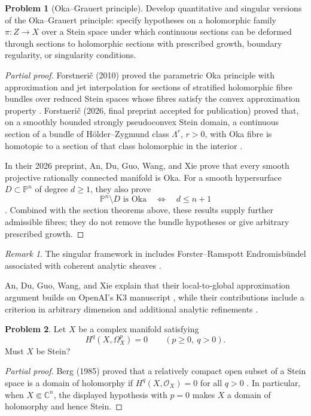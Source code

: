 \documentclass[11pt,reqno]{amsart}
\theoremstyle{definition}
\newtheorem{problem}{Problem}[section]
\theoremstyle{remark}
\newtheorem*{remark}{Remark}
\begin{document}
\begin{problem}[Oka--Grauert principle]\label{Siu-1.3}
Develop quantitative and singular versions of the Oka--Grauert principle: specify hypotheses on a holomorphic family $\pi:Z\to X$ over a Stein space under which continuous sections can be deformed through sections to holomorphic sections with prescribed growth, boundary regularity, or singularity conditions.
\end{problem}
\begin{proof}[Partial proof]
Forstneri\v c (2010) proved the parametric Oka principle with approximation and jet interpolation for sections of stratified holomorphic fibre bundles over reduced Stein spaces whose fibres satisfy the convex approximation property \cite{SIU-For10}. Forstneri\v c (2026, final preprint accepted for publication) proved that, on a smoothly bounded strongly pseudoconvex Stein domain, a continuous section of a bundle of H\"older--Zygmund class $\Lambda^r$, $r>0$, with Oka fibre is homotopic to a section of that class holomorphic in the interior \cite{SIU-For26}.

In their 2026 preprint, An, Du, Guo, Wang, and Xie prove that every smooth projective rationally connected manifold is Oka. For a smooth hypersurface $D\subset\mathbb P^n$ of degree $d\geq1$, they also prove
\[
\mathbb P^n\setminus D\text{ is Oka}\quad\Longleftrightarrow\quad d\leq n+1
\]
\cite[Theorems~1.10--1.11]{SIU-ADGWX26}. Combined with the section theorems above, these results supply further admissible fibres; they do not remove the bundle hypotheses or give arbitrary prescribed growth.
\end{proof}
\begin{remark}
The singular framework in \cite[\S1.3]{Siu2025} includes Forster--Ramspott Endromisb\"undel associated with coherent analytic sheaves \cite{SIU-FR66}.

An, Du, Guo, Wang, and Xie explain that their local-to-global approximation argument builds on OpenAI's K3 manuscript \cite{SIU-OAIK326}, while their contributions include a criterion in arbitrary dimension and additional analytic refinements \cite[\S1, ``Relation to the work of OpenAI'']{SIU-ADGWX26}.
\end{remark}

\begin{problem}\label{Z-Serre}
Let $X$ be a complex manifold satisfying
\[
 H^q(X,\Omega_X^p)=0\qquad(p\geq0,\ q>0).
\]
Must $X$ be Stein?
\end{problem}
\begin{proof}[Partial proof]
Berg (1985) proved that a relatively compact open subset of a Stein space is a domain of holomorphy if $H^q(X,\mathcal O_X)=0$ for all $q>0$ \cite{Z-Berg}. In particular, when $X\Subset\mathbb C^n$, the displayed hypothesis with $p=0$ makes $X$ a domain of holomorphy and hence Stein.
\end{proof}
\end{document}
